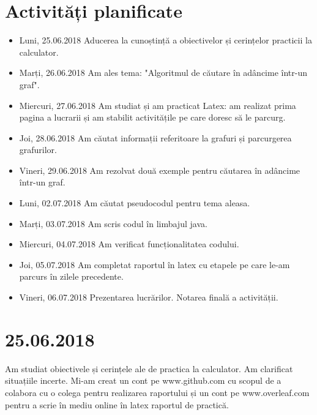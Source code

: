 \documentclass{report}
\begin{document}
\chapter{Activități planificate}
\begin{itemize}
\item  Luni, 25.06.2018 \newline
Aducerea la cunoștință a obiectivelor și cerințelor practicii la calculator.
\item  Marți, 26.06.2018 \newline
Am ales tema: "Algoritmul de căutare în adâncime într-un graf".
\item  Miercuri, 27.06.2018 \newline
Am studiat și am practicat Latex: am realizat prima pagina a lucrarii și am stabilit activitățile pe care doresc să le parcurg.
\item  Joi, 28.06.2018 \newline
Am căutat informații referitoare la grafuri și parcurgerea grafurilor.
\item  Vineri, 29.06.2018  \newline
Am rezolvat două exemple pentru căutarea în adâncime  într-un graf.
\item  Luni, 02.07.2018  \newline
Am căutat pseudocodul pentru tema aleasa.
\item  Marți, 03.07.2018  \newline
Am scris codul în limbajul java.
\item  Miercuri, 04.07.2018  \newline
Am verificat funcționalitatea codului. 
\item  Joi, 05.07.2018  \newline
Am completat raportul în latex cu etapele pe care le-am parcurs în zilele precedente.
\item  Vineri, 06.07.2018  \newline
Prezentarea lucrărilor.
Notarea finală a activității.
\end{itemize}

\chapter{25.06.2018}

Am studiat obiectivele și cerințele ale de practica la calculator. Am clarificat situațiile incerte.
Mi-am creat un cont pe www.github.com cu scopul de a colabora cu o colega pentru realizarea raportului și un cont pe www.overleaf.com pentru a scrie în mediu online în latex raportul de practică. 
\end{document}
